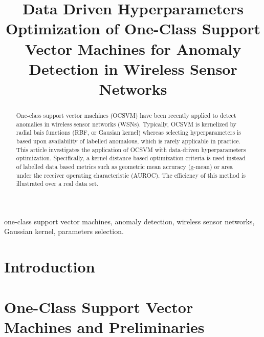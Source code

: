 \documentclass[conference]{IEEEtran}
\theoremstyle{problemstyle}
\begin{document}
\title{Data Driven Hyperparameters Optimization of One-Class Support Vector Machines for Anomaly Detection in Wireless Sensor Networks}

\author{
\and
{}
}

\maketitle

\begin{abstract}
One-class support vector machines (OCSVM) have been recently applied to detect anomalies in wireless sensor networks (WSNs). Typically, OCSVM is kernelized by radial bais functions (RBF, or Gausian kernel) whereas selecting hyperparameters is based upon availability of labelled anomalous, which is rarely applicable in practice. This article investigates the application of OCSVM with data-driven hyperparameters optimization. Specifically, a kernel distance based optimization criteria is used instead of labelled data based metrics such as geometric mean accuracy (g-mean) or area under the receiver operating characteristic (AUROC). The efficiency of this method is illustrated over a real data set. 
\end{abstract}

\begin{IEEEkeywords}
one-class support vector machines,  anomaly detection, wireless sensor networks, Gaussian kernel, parameters selection.
\end{IEEEkeywords}

\IEEEpeerreviewmaketitle

\section{Introduction}

\section{One-Class Support Vector Machines and Preliminaries}\label{sec:OCSVM}
\end{document}
